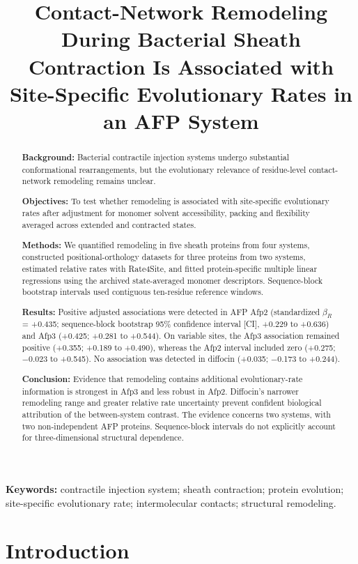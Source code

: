 \documentclass[11pt,a4paper]{article}
\title{Contact-Network Remodeling During Bacterial Sheath Contraction Is Associated with Site-Specific Evolutionary Rates in an AFP System}
\author{}
\date{}
\begin{document}
\maketitle
\begin{abstract}

\textbf{Background:} Bacterial contractile injection systems undergo substantial conformational rearrangements, but the evolutionary relevance of residue-level contact-network remodeling remains unclear.

\textbf{Objectives:} To test whether remodeling is associated with site-specific evolutionary rates after adjustment for monomer solvent accessibility, packing and flexibility averaged across extended and contracted states.

\textbf{Methods:} We quantified remodeling in five sheath proteins from four systems, constructed positional-orthology datasets for three proteins from two systems, estimated relative rates with Rate4Site, and fitted protein-specific multiple linear regressions using the archived state-averaged monomer descriptors. Sequence-block bootstrap intervals used contiguous ten-residue reference windows.

\textbf{Results:} Positive adjusted associations were detected in AFP Afp2 (standardized \(\beta_R\) = +0.435; sequence-block bootstrap 95\% confidence interval [CI], +0.229 to +0.636) and Afp3 (+0.425; +0.281 to +0.544). On variable sites, the Afp3 association remained positive (+0.355; +0.189 to +0.490), whereas the Afp2 interval included zero (+0.275; \ensuremath{-}0.023 to +0.545). No association was detected in diffocin (+0.035; \ensuremath{-}0.173 to +0.244).

\textbf{Conclusion:} Evidence that remodeling contains additional evolutionary-rate information is strongest in Afp3 and less robust in Afp2. Diffocin's narrower remodeling range and greater relative rate uncertainty prevent confident biological attribution of the between-system contrast. The evidence concerns two systems, with two non-independent AFP proteins. Sequence-block intervals do not explicitly account for three-dimensional structural dependence.

\end{abstract}

\noindent\textbf{Keywords:} contractile injection system; sheath contraction; protein evolution; site-specific evolutionary rate; intermolecular contacts; structural remodeling.

\section{Introduction}
\end{document}
